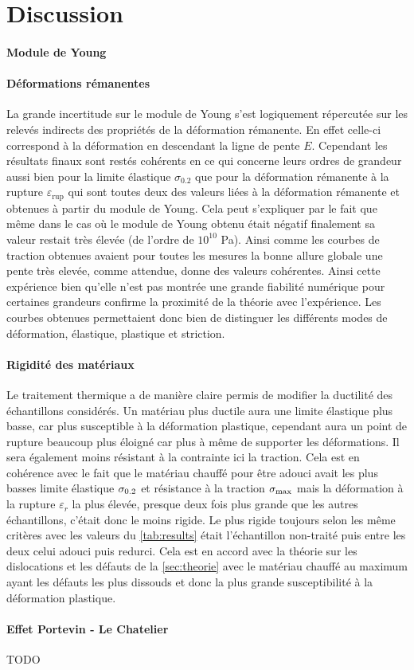 \section{Discussion}
\paragraph{Module de Young}


\paragraph{Déformations rémanentes}
La grande incertitude sur le module de Young s'est logiquement répercutée sur les relevés indirects des propriétés de la déformation rémanente. En effet celle-ci correspond à la déformation en descendant la ligne de pente $E$. Cependant les résultats finaux sont restés cohérents en ce qui concerne leurs ordres de grandeur aussi bien pour la limite élastique $\sigma_{0.2}$ que pour la déformation rémanente à la rupture $\varepsilon_\mathrm{rup}$ qui sont toutes deux des valeurs liées à la déformation rémanente et obtenues à partir du module de Young. Cela peut s'expliquer par le fait que même dans le cas où le module de Young obtenu était négatif finalement sa valeur restait très élevée (de l'ordre de $10^{10}$ \si{\pascal}). Ainsi comme les courbes de traction obtenues avaient pour toutes les mesures la bonne allure globale une pente très elevée, comme attendue, donne des valeurs cohérentes. Ainsi cette expérience bien qu'elle n'est pas montrée une grande fiabilité numérique pour certaines grandeurs confirme la proximité de la théorie avec l'expérience. Les courbes obtenues permettaient donc bien de distinguer les différents modes de déformation, élastique, plastique et striction.

\paragraph{Rigidité des matériaux}
Le traitement thermique a de manière claire permis de modifier la ductilité des échantillons considérés. Un matériau plus ductile aura une limite élastique plus basse, car plus susceptible à la déformation plastique, cependant aura un point de rupture beaucoup plus éloigné car plus à même de supporter les déformations. Il sera également moins résistant à la contrainte ici la traction. Cela est en cohérence avec le fait que le matériau chauffé pour être adouci avait les plus basses limite élastique $\sigma_{0.2}$ et résistance à la traction $\sigma_\mathrm{max}$ mais la déformation à la rupture $\varepsilon_r$ la plus élevée, presque deux fois plus grande que les autres échantillons, c'était donc le moins rigide. Le plus rigide toujours selon les même critères avec les valeurs du \autoref{tab:results} était l'échantillon non-traité puis entre les deux celui adouci puis redurci. Cela est en accord avec la théorie sur les dislocations et les défauts de la \autoref{sec:theorie} avec le matériau chauffé au maximum ayant les défauts les plus dissouds et donc la plus grande susceptibilité à la déformation plastique.


\paragraph{Effet Portevin - Le Chatelier}
TODO